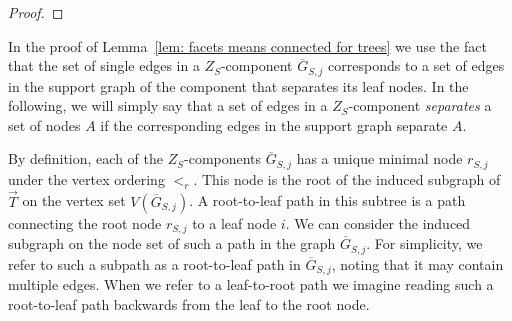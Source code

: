 \documentclass[11pt]{article}
\theoremstyle{definition}
\numberwithin{equation}{section}
\begin{document}
\begin{proof}
% 
\end{proof}

In the proof of Lemma~\ref{lem: facets means connected for trees} we use the fact that the set of single edges in a $Z_S$-component $\overline{G}_{S,j}$ corresponds to a set of edges in the support graph of the component that separates its leaf nodes. 
In the following, we will simply say that a set of edges in a $Z_S$-component \emph{separates} a set of nodes $A$ if the corresponding edges in the support graph separate $A$. 

By definition, each of the $Z_S$-components $\overline{G}_{S,j}$ has a unique minimal node $r_{S,j}$ under the vertex ordering $<_r$.  
This node is the root of the induced subgraph of $\overrightarrow{T}$ on the vertex set $V(\overline{G}_{S,j})$.  
A root-to-leaf path in this subtree is a path connecting the root node $r_{S,j}$ to a leaf node $i$.  
We can consider the induced subgraph on the node set of such a path in the graph $\overline{G}_{S,j}$.  
For simplicity, we refer to such a subpath as a root-to-leaf path in $\overline{G}_{S,j}$, noting that it may contain multiple edges.  
When we refer to a leaf-to-root path we imagine reading such a root-to-leaf path backwards from the leaf to the root node. 
\end{document}
